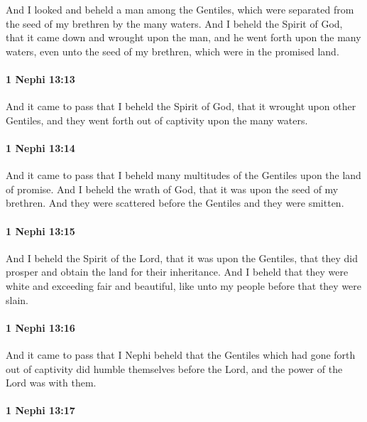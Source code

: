 			And I looked and beheld a man among the Gentiles,
			which were separated from the seed of my brethren by the many waters.
			And I beheld the Spirit of God,
			that it came down and wrought upon the man,
			and he went forth upon the many waters,
			even unto the seed of my brethren, which were in the promised land.

		\paragraph{1 Nephi 13:13} %
			\label{1NEPHI-13-13}

			And it came to pass that I beheld the Spirit of God,
			that it wrought upon other Gentiles,
			and they went forth out of captivity upon the many waters.

		\paragraph{1 Nephi 13:14} %
			\label{1NEPHI-13-14}

			And it came to pass that I beheld
			many multitudes of the Gentiles upon the land of promise.
			And I beheld the wrath of God,
			that it was upon the seed of my brethren.
			And they were scattered before the Gentiles and they were smitten.

		\paragraph{1 Nephi 13:15} %
			\label{1NEPHI-13-15}

			And I beheld the Spirit of the Lord, that it was upon the Gentiles,
			that they did prosper and obtain the land for their inheritance.
			And I beheld that they were white and exceeding fair and beautiful,
			like unto my people before that they were slain.

		\paragraph{1 Nephi 13:16} %
			\label{1NEPHI-13-16}

			And it came to pass that I Nephi beheld that the Gentiles
			which had gone forth out of captivity
			did humble themselves before the Lord,
			and the power of the Lord was with them.

		\paragraph{1 Nephi 13:17} %
			\label{1NEPHI-13-17}

